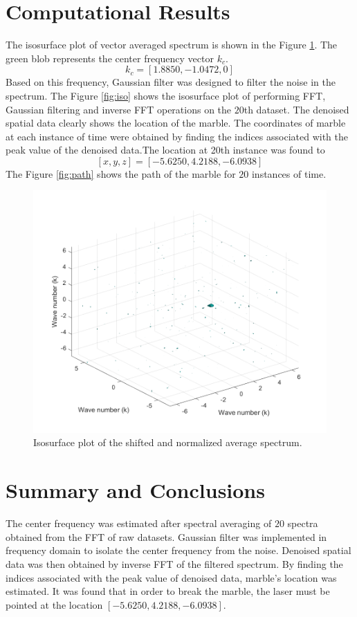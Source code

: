 \documentclass{article}
\begin{document}
\section{Computational Results}\label{Result}
The isosurface plot of vector averaged spectrum is shown in the Figure \ref{fig:ave}. The green blob represents the center frequency vector $k_c$. 
\[
k_c = [1.8850, -1.0472, 0]
\] 
Based on this frequency, Gaussian filter was designed to filter the noise in the spectrum. The Figure \ref{fig:iso} shows the isosurface plot of performing FFT, Gaussian filtering and inverse FFT operations on the $20$th dataset. The denoised spatial data clearly shows the location of the marble. The coordinates of marble at each instance of time were obtained by finding the indices associated with the peak value of the denoised data.The location at 20th instance was found to
\[
[x, y, z] = [-5.6250, 4.2188, -6.0938]
\] 
The Figure \ref{fig:path} shows the path of the marble for $20$ instances of time.

\begin{figure}[!b]
  \centering
    \includegraphics[scale=0.4]{./Figs/average_spectrum.png}
    \caption{Isosurface plot of the shifted and normalized average spectrum.}
  \label{fig:ave}
\end{figure}

\section{Summary and Conclusions}
The center frequency was estimated after spectral averaging of $20$ spectra obtained from the FFT of raw datasets. Gaussian filter was implemented in frequency domain to isolate the center frequency from the noise. Denoised spatial data was then obtained by inverse FFT of the filtered spectrum. By finding the indices associated with the peak value of denoised data, marble's location was estimated. It was found that in order to break the marble, the laser must be pointed at the location $[-5.6250, 4.2188, -6.0938]$.
\end{document}
